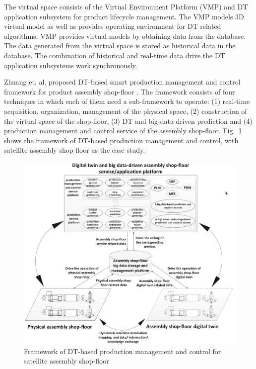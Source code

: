 \documentclass[article]{aaltoseries}
\begin{document}
The virtual space consists of the Virtual Environment Platform (VMP) and DT application subsystem for product lifecycle management. The VMP models 3D virtual model as well as provides operating environment for DT related algorithms. VMP provides virtual models by obtaining data from the database. The data generated from the virtual space is stored as historical data in the database. The combination of historical and real-time data drive the DT application subsystems work synchronously.

Zhuang et. al. proposed DT-based smart production management and control framework for product assembly shop-floor \cite{Zhuang2018}. The framework consists of four techniques in which each of them need a sub-framework to operate: (1) real-time acquisition, organization, management of the physical space, (2) construction of the virtual space of the shop-floor, (3) DT and big-data driven prediction and (4) production management and control service of the assembly shop-floor. Fig.~\ref{fig:zhuang_framework} shows the framework of DT-based production management and control, with satellite assembly shop-floor as the case study.

\begin{figure}[t!]
	\begin{center}
		\includegraphics[width=1\textwidth]{figures/zhuang_dt_framework}
		\caption{Framework of DT-based production management and control for satellite assembly shop-floor \cite{Zhuang2018}}
		\label{fig:zhuang_framework}
	\end{center}
\end{figure}
\end{document}
